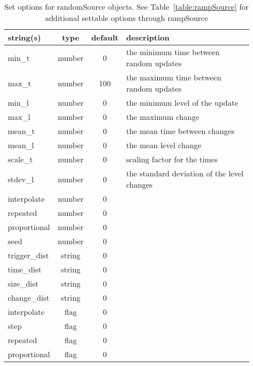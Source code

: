 \begin{table}[ht]
\centering
\begin{tabular}{p{5cm} c c p{7cm}}
\hline
string(s) & type & default & description \\
\hline
min\_t & number & 0 & the minimum time between random updates\\
max\_t & number & 100 & the maximum time between random updates\\
min\_l & number & 0 & the minimum level of the update\\
max\_l & number & 0 & the maximum change\\
mean\_t & number & 0 & the mean time between changes\\
mean\_l & number & 0 & the mean level change\\
scale\_t & number & 0 & scaling factor for the times\\
stdev\_l & number & 0 & the standard deviation of the level changes\\
interpolate & number & 0 & \\
repeated & number & 0 & \\
proportional & number & 0 & \\
seed & number & 0 & \\
trigger\_dist & string & 0 & \\
time\_dist & string & 0 & \\
size\_dist & string & 0 & \\
change\_dist & string & 0 & \\
interpolate & flag & 0 & \\
step & flag & 0 & \\
repeated & flag & 0 & \\
proportional & flag & 0 & \\
\hline
\end{tabular}
\caption{Set options for randomSource objects. See Table~\ref{table:rampSource} for additional settable options through rampSource}
\label{table:randomSource}
\end{table}


